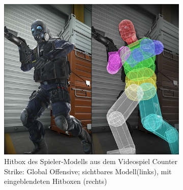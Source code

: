 \begin{figure}
	\begin{subfigure}[t]{0.45\textwidth}
		\centering
		\includegraphics[width=1\textwidth]{./res/csgo_hitbox.png}
		\caption{Hitbox des Spieler-Modells aus dem Videospiel Counter Strike: Global Offensive; sichtbares Modell(links), mit eingeblendeten Hitboxen (rechts)}
		\label{fig:chitbox}
	\end{subfigure}
~
	\begin{subfigure}[t]{0.2\textwidth}
		\centering

\end{subfigure}
\end{figure}
